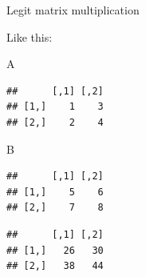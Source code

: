 \documentclass[
  ignorenonframetext,
]{beamer}
\newenvironment{Shaded}{\begin{snugshade}}{\end{snugshade}}
\newcommand{\NormalTok}[1]{#1}
\newcommand{\OperatorTok}[1]{\textcolor[rgb]{0.81,0.36,0.00}{\textbf{#1}}}
\newcommand{\StringTok}[1]{\textcolor[rgb]{0.31,0.60,0.02}{#1}}
\begin{document}
\begin{frame}[fragile]{Legit matrix multiplication}
\protect\hypertarget{legit-matrix-multiplication}{}

Like this:

\begin{Shaded}
\begin{Highlighting}[]
\NormalTok{A}
\end{Highlighting}
\end{Shaded}

\begin{verbatim}
##      [,1] [,2]
## [1,]    1    3
## [2,]    2    4
\end{verbatim}

\begin{Shaded}
\begin{Highlighting}[]
\NormalTok{B}
\end{Highlighting}
\end{Shaded}

\begin{verbatim}
##      [,1] [,2]
## [1,]    5    6
## [2,]    7    8
\end{verbatim}

\begin{Shaded}
\end{Shaded}

\begin{verbatim}
##      [,1] [,2]
## [1,]   26   30
## [2,]   38   44
\end{verbatim}

\end{frame}
\end{document}
